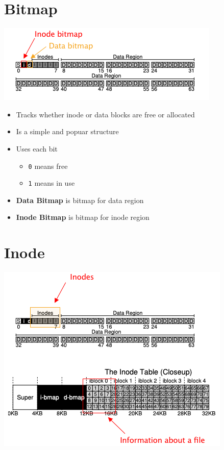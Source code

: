 \documentclass[12pt]{article}
\begin{document}
\section*{Bitmap}

\begin{center}
\includegraphics[width=\linewidth]{images/midterm_2_solution_22.png}
\end{center}

\begin{itemize}
    \item Tracks whether inode or data blocks are free or allocated
    \item Is a simple and popuar structure
    \item Uses each bit
    \begin{itemize}
        \item \texttt{0} means free
        \item \texttt{1} means in use
    \end{itemize}

    \item \textbf{Data Bitmap} is bitmap for data region
    \item \textbf{Inode Bitmap} is bitmap for inode region
\end{itemize}

\section*{Inode}

\begin{center}
\includegraphics[width=\linewidth]{images/midterm_2_solution_23.png}
\end{center}
\end{document}
